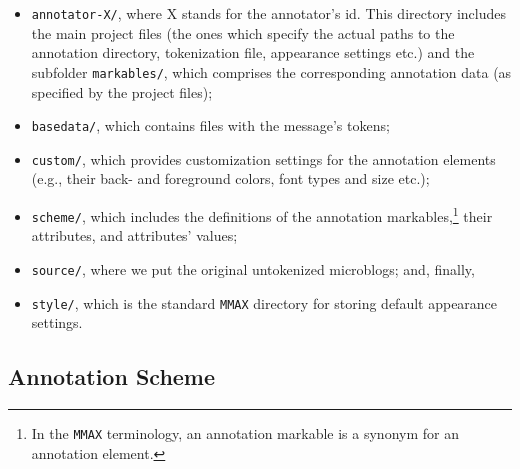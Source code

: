 \begin{itemize}
  \item\texttt{annotator-X/}, where X stands for the annotator's id.
    This directory includes the main project files (the ones which
    specify the actual paths to the annotation directory, tokenization
    file, appearance settings etc.) and the subfolder
    \texttt{markables/}, which comprises the corresponding annotation
    data (as specified by the project files);

  \item\texttt{basedata/}, which contains files with the message's
    tokens;

  \item\texttt{custom/}, which provides customization settings for the
    annotation elements (e.g., their back- and foreground colors, font
    types and size etc.);

  \item\texttt{scheme/}, which includes the definitions of the
    annotation markables,\footnote{In the \texttt{MMAX} terminology,
      an annotation markable is a synonym for an annotation element.}
    their attributes, and attributes' values;

  \item\texttt{source/}, where we put the original untokenized
    microblogs; and, finally,
  \item\texttt{style/}, which is the standard \texttt{MMAX} directory
    for storing default appearance settings.
\end{itemize}

\subsection{Annotation Scheme}\label{subsec:snt:ascheme}

